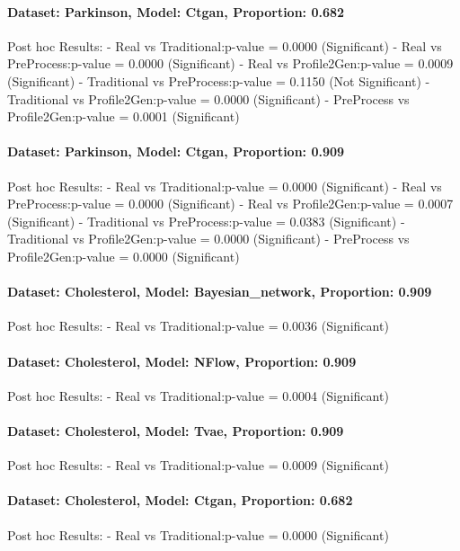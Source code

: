 \documentclass{article}
\theoremstyle{plain}
\theoremstyle{definition}
\theoremstyle{remark}
\begin{document}
\paragraph{Dataset: Parkinson, Model: Ctgan, Proportion: 0.682
}Post hoc Results:
- Real vs Traditional:p-value = 0.0000 (Significant)
- Real vs PreProcess:p-value = 0.0000 (Significant)
- Real vs Profile2Gen:p-value = 0.0009 (Significant)
- Traditional vs PreProcess:p-value = 0.1150 (Not Significant)
- Traditional vs Profile2Gen:p-value = 0.0000 (Significant)
- PreProcess vs Profile2Gen:p-value = 0.0001 (Significant)

\paragraph{Dataset: Parkinson, Model: Ctgan, Proportion: 0.909
}Post hoc Results:
- Real vs Traditional:p-value = 0.0000 (Significant)
- Real vs PreProcess:p-value = 0.0000 (Significant)
- Real vs Profile2Gen:p-value = 0.0007 (Significant)
- Traditional vs PreProcess:p-value = 0.0383 (Significant)
- Traditional vs Profile2Gen:p-value = 0.0000 (Significant)
- PreProcess vs Profile2Gen:p-value = 0.0000 (Significant)

\paragraph{Dataset: Cholesterol, Model: Bayesian\_network, Proportion: 0.909
}Post hoc Results:
- Real vs Traditional:p-value = 0.0036 (Significant)

\paragraph{Dataset: Cholesterol, Model: NFlow, Proportion: 0.909
}Post hoc Results:
- Real vs Traditional:p-value = 0.0004 (Significant)

\paragraph{Dataset: Cholesterol, Model: Tvae, Proportion: 0.909
}Post hoc Results:
- Real vs Traditional:p-value = 0.0009 (Significant)

\paragraph{Dataset: Cholesterol, Model: Ctgan, Proportion: 0.682
}Post hoc Results:
- Real vs Traditional:p-value = 0.0000 (Significant)
\end{document}
